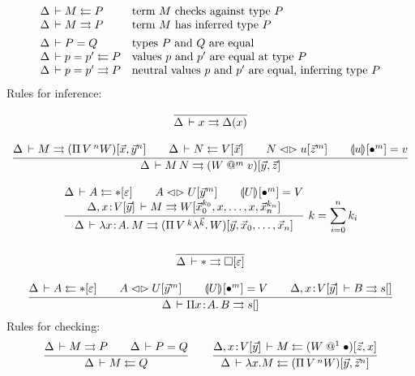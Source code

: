 \documentclass[a4paper]{article}
\makeatletter
\newcommand{\ovar}{\mathord{\bullet}}
\newcommand{\olam}[1]{\lambda^{#1}.\,}
\newcommand{\opi}[2]{\Pi\,#1\,^{#2}}
\newcommand{\lrhd}{\mathrel{\mathord{\lhd}\mathord{\rhd}}}
\newcommand{\osyn}[3]{#1 \lrhd \esubst{#2}{#3}}
\renewcommand{\esubst}[2]{#1[#2]}
\renewcommand{\sempty}{\varepsilon}
\newcommand{\oclos}[2]{#1[#2]}
\newcommand{\ochk}[4]{#1 \der #2 \jchk \oclos{#4}{#3}}
\newcommand{\oinf}[4]{#1 \der #2 \jinf \oclos{#4}{#3}}
\newcommand{\vapp}[1]{\mathrel{@^{#1}}}
\renewcommand{\eval}[2]{\dent{#1}{}[#2]}
\newcommand{\evalid}[2]{\dent{#1}{}[\ovar^{#2}]}
\makeatother
\begin{document}
\[
\begin{array}{ll}
  \Delta \,\vdash M \leftleftarrows P & \mbox{term $M$ checks against type $P$}
  \\
  \Delta \,\vdash M \rightrightarrows P & \mbox{term $M$ has inferred type $P$}
  \\[1ex]
  \Delta \,\vdash P = Q & \mbox{types $P$ and $Q$ are equal}
  \\
  \Delta \,\vdash p = p' \leftleftarrows P & \mbox{values $p$ and $p'$ are equal at
    type $P$}
  \\
  \Delta \,\vdash p = p' \rightrightarrows P & \mbox{neutral values $p$ and $p'$ are
    equal, inferring type $P$}
  \\
\end{array}
\]
Rules for inference:
\begin{gather*}
  \ru{}{\Delta \der x \jinf \Delta(x)}
\\[2ex]
  \ru{\oinf \Delta M {\vec x,{\vec y}^n} {(\opi V n W)} \qquad
      \ochk \Delta N {\vec x} V \qquad
      \osyn N u {{\vec z}^m} \qquad
      \eval u {\ovar^m} = v
    }{\oinf \Delta {M\,N} {\vec y,\vec z} {(W \vapp m v)}}
\\[2ex]
  \rux{\ochk \Delta A {\sempty} \ttype \qquad
      \osyn A U {{\vec y}^m} \qquad
      \evalid U m = V \\
      \oinf {\Delta, x \of \oclos V {\vec y}} M
            {{\vec x_0}^{k_0},x,\dots,x,{\vec x_n}^{k_n}} W
    }{\oinf \Delta {\lambda x \of A.\,M} {\vec y,\vec x_0,\dots,\vec x_n}
            {(\opi V {k} {\olam {\vec k} W})}
    }{k = \sum_{i=0}^n k_i}
\\[2ex]
  \ru{}{\oinf \Delta \ttype {\sempty} \tkind}
\\[2ex]
  \ru{\ochk \Delta A {\sempty} \ttype \qquad
      \osyn A U {{\vec y}^m} \qquad
      \evalid U m = V \qquad
      \oinf {\Delta, x \of \oclos V {\vec y}} B {} s
    }{\oinf \Delta {\Pi x \of A.\,B} {} s}
\end{gather*}
Rules for checking:
\begin{gather*}
  \ru{\Delta \der M \jinf P \qquad
      \Delta \der P = Q
    }{\Delta \der M \jchk Q}
\qquad
  \ru{\ochk {\Delta, x \of \oclos V {\vec y}} M {\vec z,x} {(W \vapp 1 \ovar)}
    }{\ochk \Delta {\lambda x.M} {\vec y,{\vec z}^n} {(\opi V n W)}}
\end{gather*}
\end{document}
